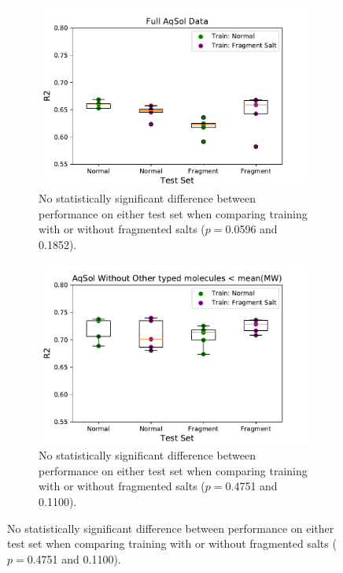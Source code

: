 \documentclass[journal=jcisd8,manuscript=article]{achemso}
\begin{document}
\begin{figure}[tb]
    \centering
    \begin{subfigure}[t]{0.48\textwidth}
        \centering
        \includegraphics[width=\linewidth]{figures/full_saltfragfirst_R2s_boxplots.pdf}
        \caption{No statistically significant difference between performance on either test set when comparing training with or without fragmented salts ($p=$0.0596 and 0.1852).}
        \label{fig:fullsfr2}
    \end{subfigure}%
    \hfill
    \begin{subfigure}[t]{0.48\textwidth}
        \centering
        \includegraphics[width=\linewidth]{figures/othersMW_saltfragfirst_R2s_boxplots.pdf}
        \caption{No statistically significant difference between performance on either test set when comparing training with or without fragmented salts ($p=$0.4751 and 0.1100).}
        \label{fig:mwsfr2}
    \end{subfigure}
    

\end{figure}
\end{document}
